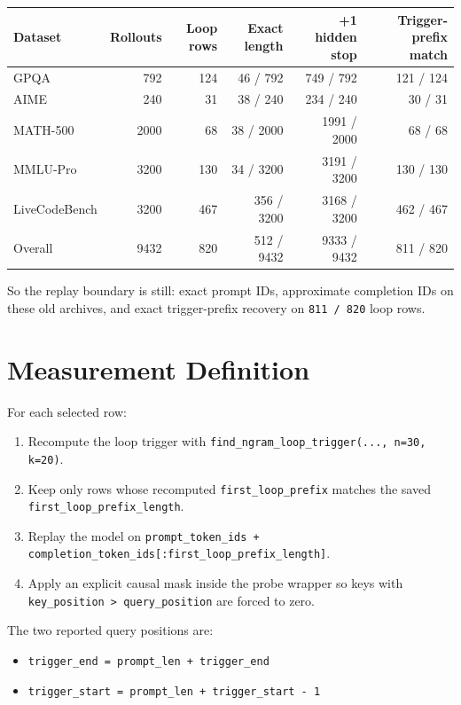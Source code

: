 \documentclass[11pt]{article}
\begin{document}
\begin{center}
\small
\begin{tabular}{lrrrrr}
\toprule
Dataset & Rollouts & Loop rows & Exact length & +1 hidden stop & Trigger-prefix match \\
\midrule
GPQA & 792 & 124 & 46 / 792 & 749 / 792 & 121 / 124 \\
AIME & 240 & 31 & 38 / 240 & 234 / 240 & 30 / 31 \\
MATH-500 & 2000 & 68 & 38 / 2000 & 1991 / 2000 & 68 / 68 \\
MMLU-Pro & 3200 & 130 & 34 / 3200 & 3191 / 3200 & 130 / 130 \\
LiveCodeBench & 3200 & 467 & 356 / 3200 & 3168 / 3200 & 462 / 467 \\
\midrule
Overall & 9432 & 820 & 512 / 9432 & 9333 / 9432 & 811 / 820 \\
\bottomrule
\end{tabular}
\normalsize
\end{center}

So the replay boundary is still: exact prompt IDs, approximate completion IDs on these old archives, and exact trigger-prefix recovery on \texttt{811 / 820} loop rows.

\section*{Measurement Definition}

For each selected row:

\begin{enumerate}
  \item Recompute the loop trigger with \texttt{find\_ngram\_loop\_trigger(..., n=30, k=20)}.
  \item Keep only rows whose recomputed \texttt{first\_loop\_prefix} matches the saved \texttt{first\_loop\_prefix\_length}.
  \item Replay the model on \texttt{prompt\_token\_ids + completion\_token\_ids[:first\_loop\_prefix\_length]}.
  \item Apply an explicit causal mask inside the probe wrapper so keys with \texttt{key\_position > query\_position} are forced to zero.
\end{enumerate}

The two reported query positions are:

\begin{itemize}
  \item \texttt{trigger\_end = prompt\_len + trigger\_end}
  \item \texttt{trigger\_start = prompt\_len + trigger\_start - 1}
\end{itemize}
\end{document}
